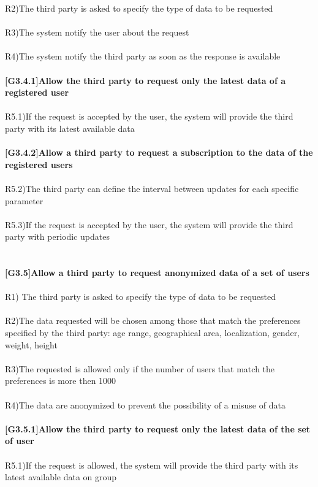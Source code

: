 R2)The third party is asked to specify the type of data to be requested\\ \\ 
R3)The system notify the user about the request\\ \\
R4)The system notify the third party as soon as the response is available \\ \\
\textbf{[G3.4.1]Allow the third party to request only the latest data of a registered user} \\ \\
R5.1)If the request is accepted by the user, the system will provide the third party with its latest available data \\ \\ 
\textbf{[G3.4.2]Allow a third party to request a subscription to the data of the registered users} \\ \\
R5.2)The third party can define the interval between updates for each specific parameter \\ \\
R5.3)If the request is accepted by the user, the system will provide the third party with periodic updates \\ \\ \\
\textbf{[G3.5]Allow a third party to request anonymized data of a set of users} \\ \\
R1) The third party is asked to specify the type of data to be requested \\ \\
 R2)The data requested will be chosen among those that match the preferences specified by the third party: age range, geographical area, localization, gender, weight, height \\ \\
R3)The requested is allowed only if the number of users that match the preferences is more then 1000 \\ \\
R4)The data are anonymized to prevent the possibility of a misuse of data \\ \\ 
\textbf{[G3.5.1]Allow the third party to request only the latest data of the set of user} \\ \\
R5.1)If the request is allowed, the system will provide the third party with its latest available data on group \\ \\
